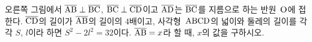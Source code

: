 \noindent\begin{minipage}[t]{0.58\linewidth}\vspace{0pt}\raggedright 오른쪽 그림에서 $\overline{\mathrm{AB}}\perp\overline{\mathrm{BC}}$, $\overline{\mathrm{BC}}\perp\overline{\mathrm{CD}}$이고 $\overline{\mathrm{AD}}$는 $\overline{\mathrm{BC}}$를 지름으로 하는 반원~$\mathrm{O}$에 접한다. $\overline{\mathrm{CD}}$의 길이가 $\overline{\mathrm{AB}}$의 길이의 $4$배이고, 사각형~$\mathrm{ABCD}$의 넓이와 둘레의 길이를 각각 $S$, $l$이라 하면 $S^2-2l^2=32$이다. $\overline{\mathrm{AB}}=x$라 할 때, $x$의 값을 구하시오.\end{minipage}\hfill\begin{minipage}[t]{0.4\linewidth}\vspace{0pt}\centering \resizebox{\ifdim\width>\linewidth\linewidth\else\width\fi}{!}{}\end{minipage}\par
